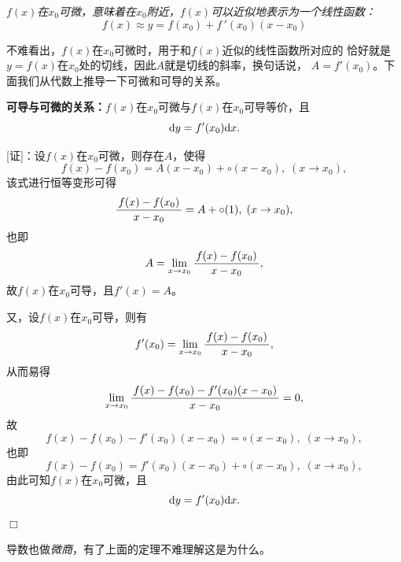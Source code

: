 \begin{center}

	\it $f(x)$在$x_0$可微，意味着在$x_0$附近，$f(x)$可以近似地表示为一个线性函数： 
	$$f(x)\approx y= f(x_0)+f\,'(x_0)(x-x_0)$$
\end{center}

不难看出，$f(x)$在$x_0$可微时，用于和$f(x)$近似的线性函数所对应的
恰好就是$y=f(x)$在$x_0$处的切线，因此$A$就是切线的斜率，换句话说，
$A=f'(x_0)$。下面我们从代数上推导一下可微和可导的关系。

\begin{thx}
	{\bf 可导与可微的关系：}$f(x)$在$x_0$可微与$f(x)$在$x_0$可导等价，且
	$$\mathrm{d} y =f'(x_0)\mathrm{d} x.$$
\end{thx}

[证]：设$f(x)$在$x_0$可微，则存在$A$，使得
$$f(x)-f(x_0)=A(x-x_0)+\circ(x-x_0),\;(x\to x_0),$$
该式进行恒等变形可得
$$\displaystyle\frac{\,{f(x)-f(x_0)}\,}{\,{x-x_0}\,}=A+\circ(1),\;(x\to x_0),$$
也即
$$A=\lim\limits_{x\to x_0}\displaystyle\frac{\,{f(x)-f(x_0)}\,}{\,{x-x_0}\,},$$
故$f(x)$在$x_0$可导，且$f'(x)=A$。

又，设$f(x)$在$x_0$可导，则有
$$f'(x_0)=\lim\limits_{x\to x_0}\displaystyle\frac{\,{f(x)-f(x_0)}\,}{\,{x-x_0}\,},$$
从而易得
$$\lim\limits_{x\to x_0}\displaystyle\frac{\,{f(x)-f(x_0)
-f'(x_0)(x-x_0)}\,}{\,{x-x_0}\,}=0,$$
故
$$f(x)-f(x_0)-f'(x_0)(x-x_0)=\circ(x-x_0),\;(x\to x_0),$$
也即
$$f(x)-f(x_0)=f'(x_0)(x-x_0)+\circ(x-x_0),\;(x\to x_0),$$
由此可知$f(x)$在$x_0$可微，且
$$\mathrm{d} y =f'(x_0)\mathrm{d} x.$$
\hfill$\Box$

导数也做{\it 微商}，有了上面的定理不难理解这是为什么。

